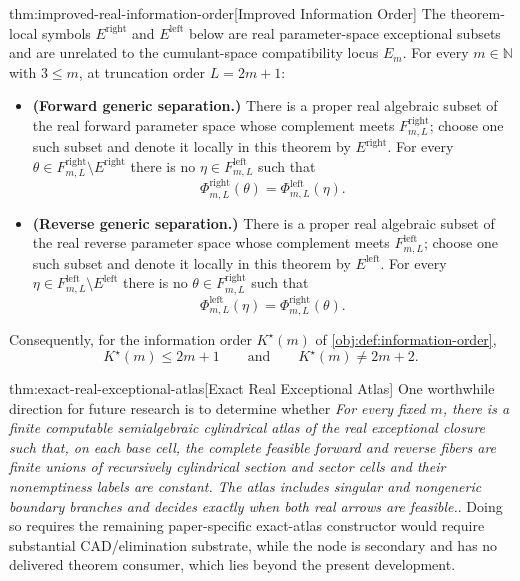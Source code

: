 \begin{theoremv}{thm:improved-real-information-order}[Improved Information Order]
The theorem-local symbols \(E^{\mathrm{right}}\) and \(E^{\mathrm{left}}\) below are real parameter-space exceptional subsets and are unrelated to the cumulant-space compatibility locus \(E_m\). For every \(m\in\mathbb N\) with \(3\le m\), at truncation order \(L=2m+1\):
\begin{itemize}
\item \textbf{(Forward generic separation.)} There is a proper real algebraic subset of the real forward parameter space whose complement meets \(F^{\mathrm{right}}_{m,L}\); choose one such subset and denote it locally in this theorem by \(E^{\mathrm{right}}\). For every \(\theta\in F^{\mathrm{right}}_{m,L}\setminus E^{\mathrm{right}}\) there is no \(\eta\in F^{\mathrm{left}}_{m,L}\) such that
\[
\Phi^{\mathrm{right}}_{m,L}(\theta)=\Phi^{\mathrm{left}}_{m,L}(\eta).
\]
\item \textbf{(Reverse generic separation.)} There is a proper real algebraic subset of the real reverse parameter space whose complement meets \(F^{\mathrm{left}}_{m,L}\); choose one such subset and denote it locally in this theorem by \(E^{\mathrm{left}}\). For every \(\eta\in F^{\mathrm{left}}_{m,L}\setminus E^{\mathrm{left}}\) there is no \(\theta\in F^{\mathrm{right}}_{m,L}\) such that
\[
\Phi^{\mathrm{left}}_{m,L}(\eta)=\Phi^{\mathrm{right}}_{m,L}(\theta).
\]
\end{itemize}
Consequently, for the information order \(K^\star(m)\) of \cref{obj:def:information-order},
\[
K^\star(m)\le 2m+1
\qquad\text{and}\qquad
K^\star(m)\ne 2m+2 .
\]
\end{theoremv}

\begin{remarkv}{thm:exact-real-exceptional-atlas}[Exact Real Exceptional Atlas]
One worthwhile direction for future research is to determine whether \emph{For every fixed \(m\), there is a finite computable semialgebraic cylindrical atlas of the real exceptional closure such that, on each base cell, the complete feasible forward and reverse fibers are finite unions of recursively cylindrical section and sector cells and their nonemptiness labels are constant. The atlas includes singular and nongeneric boundary branches and decides exactly when both real arrows are feasible.}. Doing so requires the remaining paper-specific exact-atlas constructor would require substantial CAD/elimination substrate, while the node is secondary and has no delivered theorem consumer, which lies beyond the present development.
\end{remarkv}

